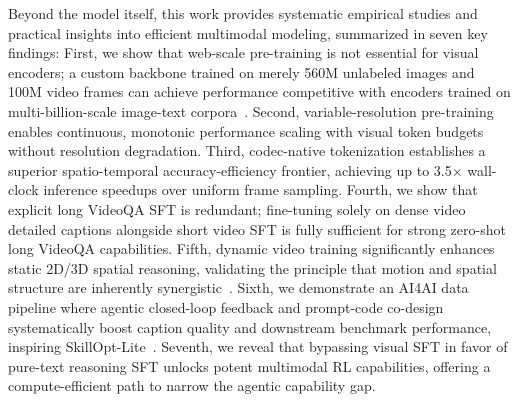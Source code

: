 
Beyond the model itself, this work provides systematic empirical studies and practical insights into efficient multimodal modeling, summarized in seven key findings: 
First, we show that web-scale pre-training is not essential for visual encoders; a custom backbone trained on merely 560M unlabeled images and 100M video frames can achieve performance competitive with encoders trained on multi-billion-scale image-text corpora~\cite{tschannen2025siglip}. 
Second, variable-resolution pre-training enables continuous, monotonic performance scaling with visual token budgets without resolution degradation. 
Third, codec-native tokenization establishes a superior spatio-temporal accuracy-efficiency frontier, achieving up to 3.5$\times$ wall-clock inference speedups over uniform frame sampling. 
Fourth, we show that explicit long VideoQA SFT is redundant; fine-tuning solely on dense video detailed captions alongside short video SFT is fully sufficient for strong zero-shot long VideoQA capabilities. 
Fifth, dynamic video training significantly enhances static 2D/3D spatial reasoning, validating the principle that motion and spatial structure are inherently synergistic~\cite{bergen1991plenoptic}. 
Sixth, we demonstrate an AI4AI data pipeline where agentic closed-loop feedback and prompt-code co-design systematically boost caption quality and downstream benchmark performance, inspiring SkillOpt-Lite~\cite{shen2026skillopt}. 
Seventh, we reveal that bypassing visual SFT in favor of pure-text reasoning SFT unlocks potent multimodal RL capabilities, offering a compute-efficient path to narrow the agentic capability gap.

